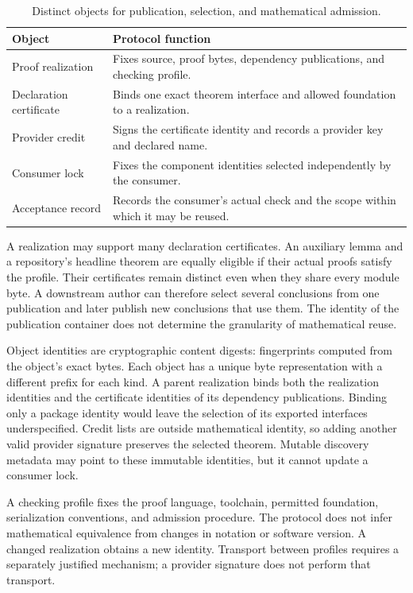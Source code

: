 \documentclass[11pt]{article}
\begin{document}
\begin{table}[ht]
\centering\small
\begin{tabularx}{\linewidth}{@{}lX@{}}
\toprule
Object & Protocol function\\
\midrule
Proof realization & Fixes source, proof bytes, dependency publications, and checking profile.\\
Declaration certificate & Binds one exact theorem interface and allowed foundation to a realization.\\
Provider credit & Signs the certificate identity and records a provider key and declared name.\\
Consumer lock & Fixes the component identities selected independently by the consumer.\\
Acceptance record & Records the consumer's actual check and the scope within which it may be reused.\\
\bottomrule
\end{tabularx}
\caption{Distinct objects for publication, selection, and mathematical admission.}
\label{tab:objects}
\end{table}

A realization may support many declaration certificates. An auxiliary lemma
and a repository's headline theorem are equally eligible if their actual
proofs satisfy the profile. Their certificates remain distinct even when they
share every module byte. A downstream author can therefore select several
conclusions from one publication and later publish new conclusions that use
them. The identity of the publication container does not determine the
granularity of mathematical reuse.

Object identities are cryptographic content digests: fingerprints computed
from the object's exact bytes. Each object has a unique byte representation
with a different prefix for each kind. A parent realization binds both the realization identities and the
certificate identities of its dependency publications. Binding only a package
identity would leave the selection of its exported interfaces underspecified.
Credit lists are outside mathematical identity, so adding another valid
provider signature preserves the selected theorem. Mutable discovery metadata
may point to these immutable identities, but it cannot update a consumer lock.

A checking profile fixes the proof language, toolchain, permitted foundation,
serialization conventions, and admission procedure. The protocol does not
infer mathematical equivalence from changes in notation or software version.
A changed realization obtains a new identity. Transport between profiles
requires a separately justified mechanism; a provider signature does not
perform that transport.
\end{document}
